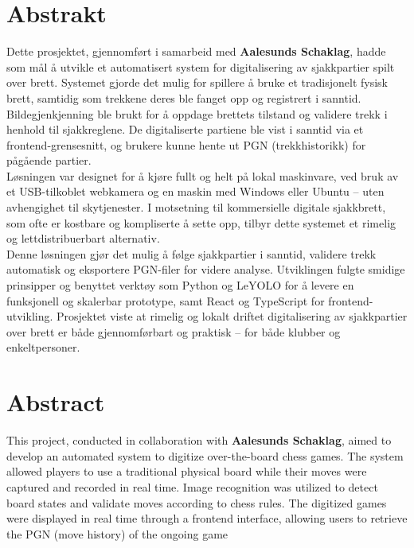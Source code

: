 \chapter*{Abstrakt}

Dette prosjektet, gjennomført i samarbeid med \textbf{Aalesunds Schaklag}, hadde som mål å utvikle et automatisert system for digitalisering av sjakkpartier spilt over brett. Systemet gjorde det mulig for spillere å bruke et tradisjonelt fysisk brett, samtidig som trekkene deres ble fanget opp og registrert i sanntid. Bildegjenkjenning ble brukt for å oppdage brettets tilstand og validere trekk i henhold til sjakkreglene. De digitaliserte partiene ble vist i sanntid via et frontend-grensesnitt, og brukere kunne hente ut PGN (trekkhistorikk) for pågående partier. \\

Løsningen var designet for å kjøre fullt og helt på lokal maskinvare, ved bruk av et USB-tilkoblet webkamera og en maskin med Windows eller Ubuntu – uten avhengighet til skytjenester. I motsetning til kommersielle digitale sjakkbrett, som ofte er kostbare og kompliserte å sette opp, tilbyr dette systemet et rimelig og lettdistribuerbart alternativ. \\

Denne løsningen gjør det mulig å følge sjakkpartier i sanntid, validere trekk automatisk og eksportere PGN-filer for videre analyse. Utviklingen fulgte smidige prinsipper og benyttet verktøy som Python og LeYOLO for å levere en funksjonell og skalerbar prototype, samt React og TypeScript for frontend-utvikling. Prosjektet viste at rimelig og lokalt driftet digitalisering av sjakkpartier over brett er både gjennomførbart og praktisk – for både klubber og enkeltpersoner.

\newpage

\chapter*{Abstract}
This project, conducted in collaboration with \textbf{Aalesunds Schaklag}, aimed to develop an automated system to digitize over-the-board chess games. The system allowed players to use a traditional physical board while their moves were captured and recorded in real time. Image recognition was utilized to detect board states and validate moves according to chess rules. The digitized games were displayed in real time through a frontend interface, allowing users to retrieve the PGN (move history) of the ongoing game \\

